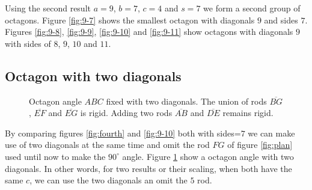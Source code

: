 \documentclass[11pt]{article}
\begin{document}
Using the second result $a=9$, $b=7$, $c=4$ and $s=7$ we form a second group
of octagons. Figure \ref{fig:9-7} shows the smallest octagon with diagonals $9$
and sides $7$. Figures \ref{fig:9-8}, \ref{fig:9-9}, \ref{fig:9-10} and \ref{fig:9-11} show octagons with diagonals $9$ with sides of $8$, $9$, $10$ and $11$.

\subsection{Octagon with two diagonals}

\begin{figure}
\centering
{}
\caption{Octagon angle $ABC$ fixed with two diagonals.
The union of rods $\overline{BG}$, $\overline{EF}$ and $\overline{EG}$ is rigid.
Adding two rods $\overline{AB}$ and $\overline{DE}$ remains rigid.}
\label{fig:diags2}
\end{figure}

By comparing figures \ref{fig:fourth} and \ref{fig:9-10} both with sides=$7$ we can 
make use of two diagonals at the same time and omit the rod $FG$ of figure \ref{fig:plan} used until now to make the $90^\circ{}$ angle. Figure \ref{fig:diags2} show a
octagon angle with two diagonals. In other words, for two results or their scaling,
when both have the same $c$, we can use the two diagonals an omit the $5$ rod.
\end{document}
